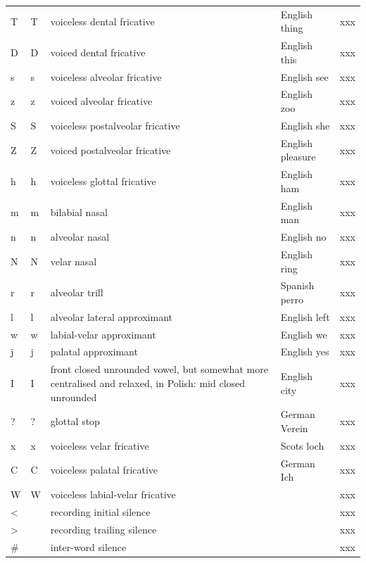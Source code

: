 \documentclass[twoside,a4paper]{book}
\begin{document}
\begin{longtable}{llp{}ll}
	T & T & voiceless dental fricative & English thing & xxx\\
	D & D & voiced dental fricative & English this & xxx\\
	s & s & voiceless alveolar fricative & English see & xxx\\
	z & z & voiced alveolar fricative & English zoo & xxx\\
	S & S & voiceless postalveolar fricative & English she & xxx\\
	Z & Z & voiced postalveolar fricative & English pleasure & xxx\\
	h & h & voiceless glottal fricative & English ham & xxx\\
	m & m & bilabial nasal & English man & xxx\\
	n & n & alveolar nasal & English no & xxx\\
	N & N & velar nasal & English ring & xxx\\
	r & r & alveolar trill & Spanish perro & xxx\\
	l & l & alveolar lateral approximant & English left & xxx\\
	w & w & labial-velar approximant & English we & xxx\\
	j & j & palatal approximant & English yes & xxx\\
	I & I & front closed unrounded vowel, but somewhat more centralised and relaxed, in Polish: mid closed unrounded & English city & xxx\\
	? & ? & glottal stop & German Verein & xxx\\
	x & x & voiceless velar fricative & Scots loch & xxx\\
	C & C & voiceless palatal fricative & German Ich & xxx\\
	W & W & voiceless labial-velar fricative &  & xxx\\
	\textless &  & recording initial silence &  & xxx\\
	\textgreater &  & recording trailing silence &  & xxx\\
	\# &  & inter-word silence &  & xxx\\
\end{longtable}

\newpage
\end{document}
